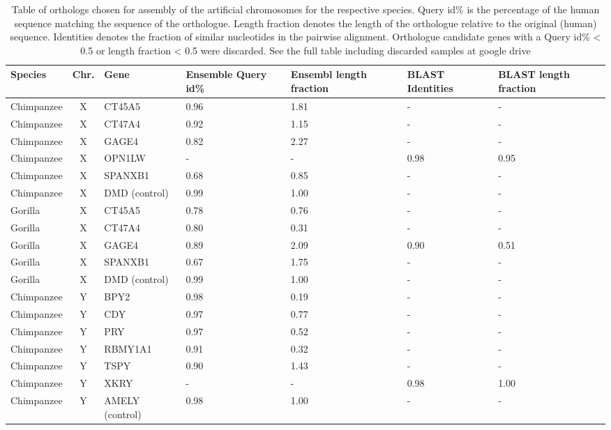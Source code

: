 \documentclass[
journal=jacsat, %
manuscript=article]{achemso}
\begin{document}
\begin{table}
\footnotesize
    \begin{center}
        \begin{tabular}{  l | c | l | p{1.8cm} | p{1.8cm} | p{1.8cm} | p{1.8cm} }
                \textbf{Species} & \textbf{Chr.} & \textbf{Gene} & \textbf{Ensemble Query id\%} & \textbf{Ensembl length fraction} & \textbf{BLAST Identities} & \textbf{BLAST length fraction} \\ 
                \hline
                    Chimpanzee & X & CT45A5 & 0.96 & 1.81 & - & - \\ 
                    Chimpanzee & X & CT47A4 & 0.92 & 1.15 & - & - \\ 
                    Chimpanzee & X & GAGE4 & 0.82 & 2.27 & - & - \\ 
                    Chimpanzee & X & OPN1LW & - & - & 0.98 & 0.95 \\ 
                    Chimpanzee & X & SPANXB1 & 0.68 & 0.85 & - & - \\ 
                    Chimpanzee & X & DMD (control) & 0.99 & 1.00 & - & - \\ 
                    \hline
                    Gorilla & X & CT45A5 & 0.78 & 0.76 & - & - \\ 
                    Gorilla & X & CT47A4 & 0.80 & 0.31 & - & - \\ 
                    Gorilla & X & GAGE4 & 0.89 & 2.09 & 0.90 & 0.51 \\ 
                    Gorilla & X & SPANXB1 & 0.67 & 1.75 & - & - \\ 
                    Gorilla & X & DMD (control) & 0.99 & 1.00 & - & - \\ 
                    \hline
                    Chimpanzee & Y & BPY2 & 0.98 & 0.19 & - & - \\ 
                    Chimpanzee & Y & CDY & 0.97 & 0.77 & - & - \\ 
                    Chimpanzee & Y & PRY & 0.97 & 0.52 & - & - \\ 
                    Chimpanzee & Y & RBMY1A1 & 0.91 & 0.32 & - & - \\ 
                    Chimpanzee & Y & TSPY & 0.90 & 1.43 & - & - \\ 
                    Chimpanzee & Y & XKRY & - & - & 0.98 & 1.00 \\ 
                    Chimpanzee & Y & AMELY (control) & 0.98 & 1.00 & - & - \\ 
        \end{tabular}
        \caption{Table of orthologs chosen for assembly of the artificial chromosomes for the respective species. Query id\% is the percentage of the human sequence matching the sequence of the orthologue. Length fraction denotes the length of the orthologue relative to the original (human) sequence. Identities denotes the fraction of similar nucleotides in the pairwise alignment. Orthologue candidate genes with a Query id\% < 0.5 or length fraction < 0.5 were discarded. See the full table including discarded samples at google drive\cite{gdriveorthoac}}
        \label{tab:orthologs}
    \end{center}
\end{table}
\end{document}
